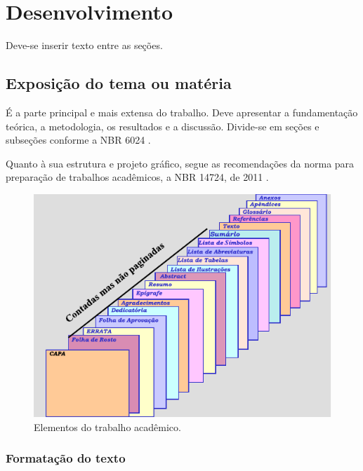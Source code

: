 \chapter{Desenvolvimento}\label{cap:desenvolvimento}
Deve-se inserir texto entre as seções.

\section{Exposição do tema ou matéria}

É a parte principal e mais extensa do trabalho. Deve apresentar a fundamentação teórica, a metodologia, os resultados e a discussão. Divide-se em seções e subseções conforme a NBR 6024 \cite{NBR6024:2012}.

Quanto à sua estrutura e projeto gráfico, segue as recomendações da norma para preparação de trabalhos acadêmicos, a NBR 14724, de 2011 \cite{NBR14724:2011}.

\begin{figure}[htb]
	\caption{\label{fig:Fig_1}Elementos do trabalho acadêmico.}
	\begin{center}
		\includegraphics{figuras/imagem.pdf}
	\end{center}
\end{figure}

\subsection{Formatação do texto}

